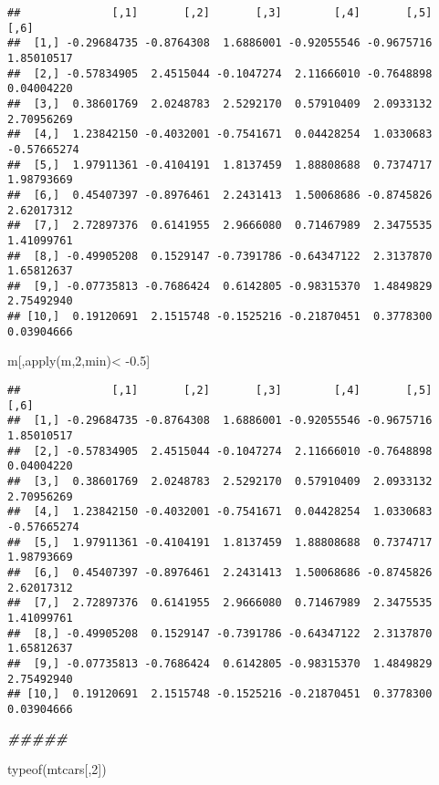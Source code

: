 \documentclass[]{article}
\newenvironment{Shaded}{\begin{snugshade}}{\end{snugshade}}
\newcommand{\DecValTok}[1]{\textcolor[rgb]{0.00,0.00,0.81}{#1}}
\newcommand{\DocumentationTok}[1]{\textcolor[rgb]{0.56,0.35,0.01}{\textbf{\textit{#1}}}}
\newcommand{\FloatTok}[1]{\textcolor[rgb]{0.00,0.00,0.81}{#1}}
\newcommand{\FunctionTok}[1]{\textcolor[rgb]{0.00,0.00,0.00}{#1}}
\newcommand{\NormalTok}[1]{#1}
\newcommand{\SpecialCharTok}[1]{\textcolor[rgb]{0.00,0.00,0.00}{#1}}
\begin{document}
\begin{verbatim}
##              [,1]       [,2]       [,3]        [,4]       [,5]        [,6]
##  [1,] -0.29684735 -0.8764308  1.6886001 -0.92055546 -0.9675716  1.85010517
##  [2,] -0.57834905  2.4515044 -0.1047274  2.11666010 -0.7648898  0.04004220
##  [3,]  0.38601769  2.0248783  2.5292170  0.57910409  2.0933132  2.70956269
##  [4,]  1.23842150 -0.4032001 -0.7541671  0.04428254  1.0330683 -0.57665274
##  [5,]  1.97911361 -0.4104191  1.8137459  1.88808688  0.7374717  1.98793669
##  [6,]  0.45407397 -0.8976461  2.2431413  1.50068686 -0.8745826  2.62017312
##  [7,]  2.72897376  0.6141955  2.9666080  0.71467989  2.3475535  1.41099761
##  [8,] -0.49905208  0.1529147 -0.7391786 -0.64347122  2.3137870  1.65812637
##  [9,] -0.07735813 -0.7686424  0.6142805 -0.98315370  1.4849829  2.75492940
## [10,]  0.19120691  2.1515748 -0.1525216 -0.21870451  0.3778300  0.03904666
\end{verbatim}

\begin{Shaded}
\begin{Highlighting}[]
\NormalTok{m[,}\FunctionTok{apply}\NormalTok{(m,}\DecValTok{2}\NormalTok{,min)}\SpecialCharTok{\textless{}}  \SpecialCharTok{{-}}\FloatTok{0.5}\NormalTok{]}
\end{Highlighting}
\end{Shaded}

\begin{verbatim}
##              [,1]       [,2]       [,3]        [,4]       [,5]        [,6]
##  [1,] -0.29684735 -0.8764308  1.6886001 -0.92055546 -0.9675716  1.85010517
##  [2,] -0.57834905  2.4515044 -0.1047274  2.11666010 -0.7648898  0.04004220
##  [3,]  0.38601769  2.0248783  2.5292170  0.57910409  2.0933132  2.70956269
##  [4,]  1.23842150 -0.4032001 -0.7541671  0.04428254  1.0330683 -0.57665274
##  [5,]  1.97911361 -0.4104191  1.8137459  1.88808688  0.7374717  1.98793669
##  [6,]  0.45407397 -0.8976461  2.2431413  1.50068686 -0.8745826  2.62017312
##  [7,]  2.72897376  0.6141955  2.9666080  0.71467989  2.3475535  1.41099761
##  [8,] -0.49905208  0.1529147 -0.7391786 -0.64347122  2.3137870  1.65812637
##  [9,] -0.07735813 -0.7686424  0.6142805 -0.98315370  1.4849829  2.75492940
## [10,]  0.19120691  2.1515748 -0.1525216 -0.21870451  0.3778300  0.03904666
\end{verbatim}

\begin{Shaded}
\begin{Highlighting}[]
\DocumentationTok{\#\#\#\#\#}

\FunctionTok{typeof}\NormalTok{(mtcars[,}\DecValTok{2}\NormalTok{])}
\end{Highlighting}
\end{Shaded}
\end{document}

